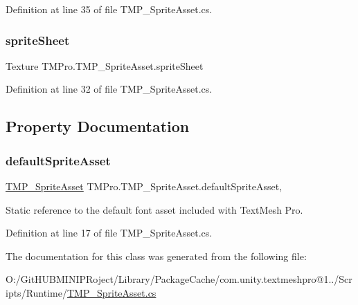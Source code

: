 Definition at line 35 of file T\+M\+P\+\_\+\+Sprite\+Asset.\+cs.

\mbox{\label{class_t_m_pro_1_1_t_m_p___sprite_asset_ad58008ac004e19c361192d6159f34367}} 
\subsubsection{\texorpdfstring{spriteSheet}{spriteSheet}}
{\footnotesize\ttfamily Texture T\+M\+Pro.\+T\+M\+P\+\_\+\+Sprite\+Asset.\+sprite\+Sheet}



Definition at line 32 of file T\+M\+P\+\_\+\+Sprite\+Asset.\+cs.



\subsection{Property Documentation}
\mbox{\label{class_t_m_pro_1_1_t_m_p___sprite_asset_a8a0537826f6a024c10fa80ea29f957f7}} 
\subsubsection{\texorpdfstring{defaultSpriteAsset}{defaultSpriteAsset}}
{\footnotesize\ttfamily \mbox{\hyperlink{class_t_m_pro_1_1_t_m_p___sprite_asset}{T\+M\+P\+\_\+\+Sprite\+Asset}} T\+M\+Pro.\+T\+M\+P\+\_\+\+Sprite\+Asset.\+default\+Sprite\+Asset\hspace{0.3cm}{\ttfamily [static]}, {\ttfamily [get]}}



Static reference to the default font asset included with Text\+Mesh Pro. 



Definition at line 17 of file T\+M\+P\+\_\+\+Sprite\+Asset.\+cs.



The documentation for this class was generated from the following file\+:\begin{DoxyCompactItemize}
\item 
O\+:/\+Git\+H\+U\+B\+M\+I\+N\+I\+P\+Roject/\+Library/\+Package\+Cache/com.\+unity.\+textmeshpro@1../\+Scripts/\+Runtime/\mbox{\hyperlink{_t_m_p___sprite_asset_8cs}{T\+M\+P\+\_\+\+Sprite\+Asset.\+cs}}\end{DoxyCompactItemize}
